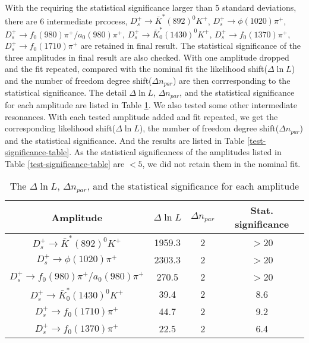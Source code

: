 {With the requiring the statistical significance larger than 5 standard deviations, there are 6 intermediate prcocess, 
$D_{s}^{+} \rightarrow \bar{K}^{*}(892)^{0}K^{+}$,
$D_{s}^{+} \rightarrow \phi(1020)\pi^{+}$,
$D_{s}^{+} \rightarrow f_{0}(980)\pi^{+}/a_{0}(980)\pi^{+}$,
$D_{s}^{+} \rightarrow \bar{K}^{*}_{0}(1430)^{0}K^{+}$,
$D_{s}^{+} \rightarrow f_{0}(1370)\pi^{+}$,
$D_{s}^{+} \rightarrow f_{0}(1710)\pi^{+}$ 
are retained in final result. The statistical significance of the three amplitudes in final result are also checked.
With one amplitude dropped and the fit repeated, compared with the nominal fit the likelihood shift($\Delta\ln L$) and the number of freedom degree shift($\Delta n_{par}$) are then corrresponding to the statistical significance.
The detail $\Delta\ln L$, $\Delta n_{par}$, and the statistical significance for each amplitude are  listed in Table \ref{significance-table}.
We also tested some other intermediate resonances. With each tested amplitude added and fit repeated, we get the corresponding likelihood shift($\Delta\ln L$), the number of freedom degree shift($\Delta n_{par}$) and the statistical significance.
And the results are listed in Table \ref{test-significance-table}.
As the statistical significances of the amplitudes listed in Table \ref{test-significance-table} are $<5$, we did not retain them in the nominal fit. 
\begin{table}
    \caption{The $\Delta\ln L$, $\Delta n_{par}$, and the statistical significance for each amplitude}
    \label{significance-table}
    \begin{center}
        \begin{tabular}{cccc}
            \toprule
            Amplitude & $\Delta\ln L$ & $\Delta n_{par}$ & Stat. significance\\
            \hline
            $D_{s}^{+} \rightarrow \bar{K}^{*}(892)^{0}K^{+}$              & 1959.3     & 2   & $>$20\\
            $D_{s}^{+} \rightarrow \phi(1020)\pi^{+}$                      & 2303.3     & 2   & $>$20\\
            $D_{s}^{+} \rightarrow f_{0}(980)\pi^{+}/a_{0}(980)\pi^{+}$    & 270.5      & 2   & $>$20\\
            $D_{s}^{+} \rightarrow \bar{K}^{*}_{0}(1430)^{0}K^{+}$         & 39.4       & 2   & 8.6\\
            $D_{s}^{+} \rightarrow f_{0}(1710)\pi^{+}$                     & 44.7       & 2   & 9.2\\
            $D_{s}^{+} \rightarrow f_{0}(1370)\pi^{+}$                     & 22.5       & 2   & 6.4\\
            \bottomrule
        \end{tabular}
    \end{center}
\end{table}

}
